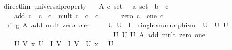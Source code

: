 \documentclass[12pt]{scrartcl}
\begin{document}
\begin{isabelle}
\isamarkupfalse%
\ {\isacharparenleft}{\kern0pt}\ direct{\isacharunderscore}{\kern0pt}lim{\isacharparenright}{\kern0pt}\ universal{\isacharunderscore}{\kern0pt}property{\isacharcolon}{\kern0pt}\isanewline
\ \ \ A{\isacharcolon}{\kern0pt}{\isacharcolon}{\kern0pt}\ {\isachardoublequoteopen}{\isacharprime}{\kern0pt}c\ set{\isachardoublequoteclose}\ \ {\isasympsi}{\isacharcolon}{\kern0pt}{\isacharcolon}{\kern0pt}\ {\isachardoublequoteopen}{\isacharprime}{\kern0pt}a\ set\ {\isasymRightarrow}\ {\isacharparenleft}{\kern0pt}{\isacharprime}{\kern0pt}b\ {\isasymRightarrow}\ {\isacharprime}{\kern0pt}c{\isacharparenright}{\kern0pt}{\isachardoublequoteclose}\ \isanewline
\ \ \ \ \ add{\isacharcolon}{\kern0pt}{\isacharcolon}{\kern0pt}\ {\isachardoublequoteopen}{\isacharprime}{\kern0pt}c\ {\isasymRightarrow}\ {\isacharprime}{\kern0pt}c\ {\isasymRightarrow}\ {\isacharprime}{\kern0pt}c{\isachardoublequoteclose}\ \ mult{\isacharcolon}{\kern0pt}{\isacharcolon}{\kern0pt}\ {\isachardoublequoteopen}{\isacharprime}{\kern0pt}c\ {\isasymRightarrow}\ {\isacharprime}{\kern0pt}c\ {\isasymRightarrow}\ {\isacharprime}{\kern0pt}c{\isachardoublequoteclose}\ \isanewline
\ \ \ \ \ zero{\isacharcolon}{\kern0pt}{\isacharcolon}{\kern0pt}\ {\isachardoublequoteopen}{\isacharprime}{\kern0pt}c{\isachardoublequoteclose}\ \ one{\isacharcolon}{\kern0pt}{\isacharcolon}{\kern0pt}\ {\isachardoublequoteopen}{\isacharprime}{\kern0pt}c{\isachardoublequoteclose}\isanewline
\ \ \ {\isachardoublequoteopen}ring\ A\ add\ mult\ zero\ one{\isachardoublequoteclose}\isanewline
\ \ \ \ \ {\isachardoublequoteopen}{\isasymAnd}U{\isachardot}{\kern0pt}\ U\ {\isasymin}\ I\ {\isasymLongrightarrow}\ ring{\isacharunderscore}{\kern0pt}homomorphism\ {\isacharparenleft}{\kern0pt}{\isasympsi}\ U{\isacharparenright}{\kern0pt}\ {\isacharparenleft}{\kern0pt}{\isasymFF}\ U{\isacharparenright}{\kern0pt}\ {\isacharparenleft}{\kern0pt}{\isacharplus}{\kern0pt}\isactrlbsub U\isactrlesub {\isacharparenright}{\kern0pt}\ \isanewline
\ \ \ \ \ \ \ \ \ \ \ \ \ \ \ \ \ \ \ \ \ \ \ \ \ \ \ \ \ \ \ \ \ \ {\isacharparenleft}{\kern0pt}{\isasymcdot}\isactrlbsub U\isactrlesub {\isacharparenright}{\kern0pt}\ {\isasymzero}\isactrlbsub U\isactrlesub \ {\isasymone}\isactrlbsub U\isactrlesub \ A\ add\ mult\ zero\ one{\isachardoublequoteclose}\isanewline
\ \ \ \ \ {\isachardoublequoteopen}{\isasymAnd}U\ V\ x{\isachardot}{\kern0pt}\ {\isasymlbrakk}U\ {\isasymin}\ I{\isacharsemicolon}{\kern0pt}\ V\ {\isasymin}\ I{\isacharsemicolon}{\kern0pt}\ V\ {\isasymsubseteq}\ U{\isacharsemicolon}{\kern0pt}\ x\ {\isasymin}\ {\isacharparenleft}{\kern0pt}{\isasymFF}\ U{\isacharparenright}{\kern0pt}{\isasymrbrakk}\ \isanewline

\end{isabelle}
\end{document}
